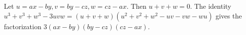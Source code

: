 Let $u=ax-by,v=by-cz,w=cz-ax$. Then $u+v+w=0$. The identity $u^3+v^3+w^3-3uvw=(u+v+w)(u^2+v^2+w^2-uv-vw-wu)$ gives the factorization $\boxed{3(ax-by)(by-cz)(cz-ax)}$.
